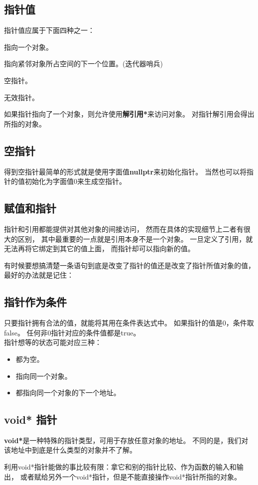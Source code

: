 \subsection{指针值}
指针值应属于下面四种之一：
\begin{list}{*}{}
\item{指向一个对象。}
\item{指向紧邻对象所占空间的下一个位置。(迭代器哨兵)}
\item{空指针。}
\item{无效指针。}
\end{list}
如果指针指向了一个对象，则允许使用{\bfseries{解引用*}}来访问对象。%
对指针解引用会得出所指的对象。%
\subsection{空指针}
得到空指针最简单的形式就是使用字面值{\bfseries{nullptr}}来初始化指针。%
当然也可以将指针的值初始化为字面值0来生成空指针。
\subsection{赋值和指针}
指针和引用都能提供对其他对象的间接访问，%
然而在具体的实现细节上二者有很大的区别，%
其中最重要的一点就是引用本身不是一个对象。%
一旦定义了引用，就无法再将它绑定到其它的值上面，%
而指针却可以指向新的值。
\par
有时候要想搞清楚一条语句到底是改变了指针的值还是改变了指针所值对象的值，%
最好的办法就是记住：
\begin{center}
  {\color{red}{赋值永远改变的是等号左边的对象。}}
\end{center}
\subsection{指针作为条件}
只要指针拥有合法的值，就能将其用在条件表达式中。%
如果指针的值是0，条件取false。%
任何非0指针对应的条件值都是true。\\%
指针想等的状态可能对应三种：
\begin{itemize}
\item{都为空。}
\item{指向同一个对象。}
\item{都指向同一个对象的下一个地址。}
\end{itemize}
\subsection{void* 指针}
{\bfseries{void*}}是一种特殊的指针类型，可用于存放任意对象的地址。%
不同的是，我们对该地址中到底是什么类型的对象并不了解。%
\par
利用void*指针能做的事比较有限：拿它和别的指针比较、作为函数的输入和输出，%
或者赋给另外一个void*指针，但是不能直接操作void*指针所指的对象。

